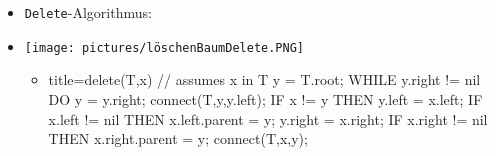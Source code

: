 \documentclass[
    12pt,
    a4paper,
    ngerman,
    color=3b,%
    marginpar=false,
    colorback=false,
    leqno,
]{tudaexercise}
\begin{document}
\begin{itemize}
\begin{itemize}
\begin{itemize}
                        \item \texttt{Delete}-Algorithmus:
                        \item[]
                              \begin{minipage}{0.4\textwidth}
                                  \texttt{[image: pictures/löschenBaumDelete.PNG]}
                              \end{minipage}
                              \begin{minipage}{0.45\textwidth}
                                  \begin{itemize}
                                      \item[]
                                            \begin{codeBlock}[autogobble]{title={delete(T,x) // assumes x in T}}
                                                y = T.root;
                                                WHILE y.right != nil DO
                                                    y = y.right;
                                                connect(T,y,y.left);
                                                IF x != y THEN
                                                    y.left = x.left;
                                                    IF x.left != nil THEN
                                                        x.left.parent = y;
                                                    y.right = x.right;
                                                    IF x.right != nil THEN
                                                        x.right.parent = y;
                                                    connect(T,x,y);
                                            \end{codeBlock}
                                  \end{itemize}
                              \end{minipage}
                    \end{itemize}
          \end{itemize}
\end{itemize}

\pagebreak
\end{document}
